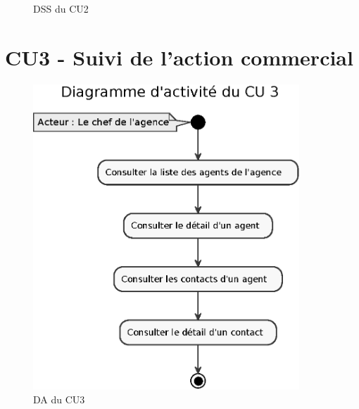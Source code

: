 \begin{figure}[H]
\noindent{}
\caption{DSS du CU2}
\end{figure}



\section{CU3 - Suivi de l’action commercial}

\begin{figure}[H]
\centering
\includegraphics[width=10cm]{figures/eps/DA_CU3.eps}
\caption{DA du CU3}
\end{figure}

